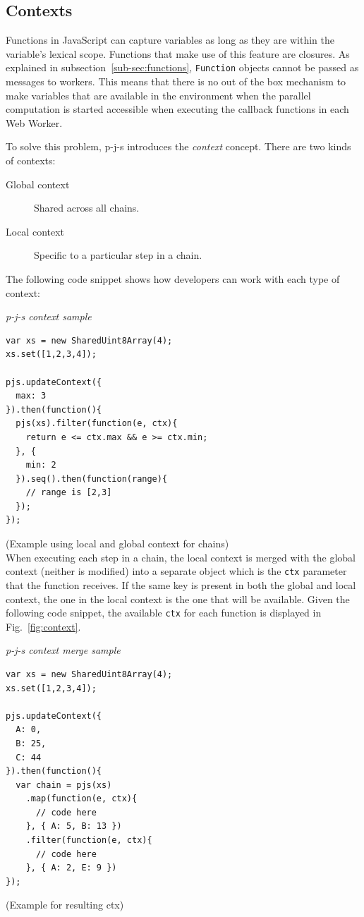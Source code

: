 \documentclass[runningheads,a4paper]{llncs}
\begin{document}
\subsection{Contexts}\label{sub-sec:context}
Functions in JavaScript can capture variables as long as they are within the variable's lexical scope. Functions that make use  of this feature are closures. As explained in subsection~\ref{sub-sec:functions}, \verb+Function+ objects cannot be passed as messages to workers. This means that there is no out of the box mechanism to make variables that are available in the environment when the parallel computation is started accessible when executing the callback functions in each Web Worker.

To solve this problem, p-j-s introduces the \emph{context} concept. There are two kinds of contexts:
\begin{description}
\item[Global context] Shared across all chains.
\item[Local context] Specific to a particular step in a chain.
\end{description}

The following code snippet shows how developers can work with each type of context:
\medskip

\noindent
{\it p-j-s context sample}
\begin{verbatim}
var xs = new SharedUint8Array(4);
xs.set([1,2,3,4]);

pjs.updateContext({
  max: 3
}).then(function(){
  pjs(xs).filter(function(e, ctx){
    return e <= ctx.max && e >= ctx.min;
  }, {
    min: 2
  }).seq().then(function(range){
    // range is [2,3]
  });
});

\end{verbatim}
%
\noindent
{\small (Example using local and global context for chains)}\\

When executing each step in a chain, the local context is merged with the global context (neither is modified) into a separate object which is the \verb+ctx+ parameter that the function receives. If the same key is present in both the global and local context, the one in the local context is the one that will be available. Given the following code snippet, the available \verb+ctx+ for each function is displayed in Fig.~\ref{fig:context}.
\medskip

\noindent
{\it p-j-s context merge sample}
\begin{verbatim}
var xs = new SharedUint8Array(4);
xs.set([1,2,3,4]);

pjs.updateContext({
  A: 0,
  B: 25,
  C: 44
}).then(function(){
  var chain = pjs(xs)
    .map(function(e, ctx){
      // code here
    }, { A: 5, B: 13 })
    .filter(function(e, ctx){
      // code here
    }, { A: 2, E: 9 })
});

\end{verbatim}
%
\noindent
{\small (Example for resulting ctx)}\\
\end{document}
